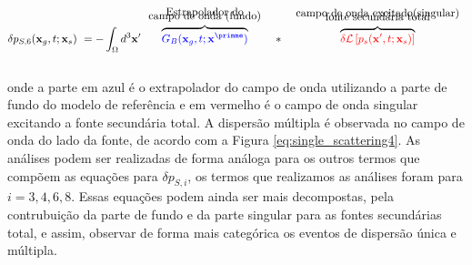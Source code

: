 \begin{eqnarray}
\delta p_{S,6}(\mathbf{x}_{g}, t; \mathbf{x}_s) ~= - \int_{\Omega} d^3\mathbf{x}^{\prime} 
\overbrace{\color{blue}G_B(\mathbf{x}_{g}, t; \mathbf{x}^{\primme})}^{\begin{array}{c}
\text{Estrapolador do} \\[-3mm]
 \text{campo de onda (fundo)}\end{array}} ~~*~~ 
                 \overbrace{{\color{red}\delta\mathcal{L}\left[p_s(\mathbf{x}^{\prime}, t;
                            \mathbf{x}_s)\right]}}^{\begin{array}{c}
                            \text{campo de onda excitado(singular)} \\[-3mm]
                            \text{fonte secundária total} \end{array}}
\label{eq:single_scattering4}
\end{eqnarray}
\\
onde a parte em azul é o extrapolador do campo de onda utilizando a parte de fundo do modelo de referência e em vermelho é o campo de onda singular excitando a fonte secundária total. A dispersão múltipla é observada no campo de onda do lado da fonte, de acordo com a Figura \ref{eq:single_scattering4}. 
As análises podem ser realizadas de forma análoga para os outros termos que compõem as equações para $\delta p_{S,i}$, os termos que realizamos as análises foram para $i=3,4,6,8$. Essas equações podem ainda ser mais decompostas, pela contrubuição da parte de fundo e da parte singular para as fontes secundárias total, e assim, observar de forma mais categórica os eventos de dispersão única e múltipla.
